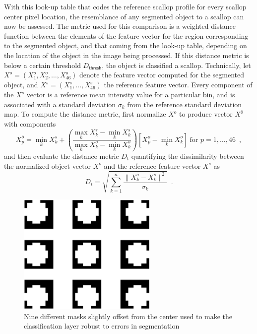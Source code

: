 \documentclass {udthesis}
\begin{document}
With this look-up table that codes the reference scallop profile for every scallop center pixel location,
the resemblance of any segmented object to a scallop can now be assessed.
The metric used for this comparison is a weighted distance function between the 
elements of the feature vector for the region corresponding to the segmented object, and that coming from the look-up table, depending on the location of the object in the image being processed.
If this distance metric is below a certain threshold $D_\mathsf{thresh}$, the object is classified
a scallop.
Technically, let $X^o=(X^o_1,X^o_2, \ldots,X^o_{46})$ denote the feature vector computed for the segmented object,
and $X^s=(X^s_1,\ldots,X^s_{46})$ the reference
feature vector. 
Every component of the $X^s$ vector is a reference mean intensity value for a particular bin, and is associated with a standard deviation $\sigma_k$ from the reference standard deviation map.
To compute the distance metric, first normalize $X^o$ to produce vector $X^{\bar{o}}$ with components 
%
\[
X^{\bar{o}}_p = \min_{k} X^s_k + \left(\frac{\max \limits_{k} X^s_k-\min \limits_{k} X^s_k}{\max \limits_{k} X^o_k-\min \limits _{k} X^o_k}
\right)\left[ X^o_p-\min_{k} X^o_k \right] \;\text{for } p=1,\ldots,46\enspace,
\]
%
and then evaluate the distance metric $D_{t}$ quantifying the dissimilarity between the normalized object vector $X^{\bar{o}}$ and the reference feature vector $X^s$ as
%
\begin{equation}\label{distance}
D_{t} = \sqrt{\sum_{k=1}^n\frac{\|X^{\bar{o}}_{k}-X^s_k\|^2}{\sigma_k}} \enspace .
\end{equation}
%

%
\begin{figure}
\centering
\includegraphics[width=0.6\textwidth]{mask_offset}
\caption[Template matching masks]{Nine different masks slightly offset from the center used to make the classification layer
robust to errors in segmentation}
\label{fig:scallop_masks}
\end{figure}
%
\end{document}
